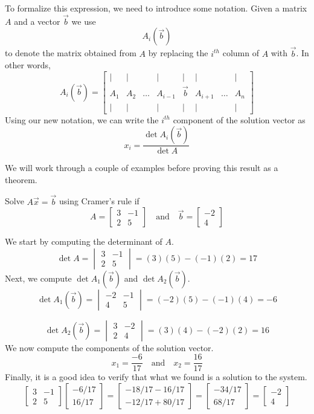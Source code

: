 \documentclass{ximera}
\begin{document}
To formalize this expression, we need to introduce some notation.  Given a matrix $A$ and a vector $\vec{b}$ we use 
$$A_i(\vec{b})$$
to denote the matrix obtained from $A$ by replacing the $i^{th}$ column of $A$ with $\vec{b}$. In other words,
$$A_i(\vec{b})=\begin{bmatrix}
           | & |& &|&|&|&&|\\
		A_1 & A_2&\dots &A_{i-1}&\vec{b}&A_{i+1}&\dots&A_n\\
		| & |& &|&|&|&&|
         \end{bmatrix}$$
Using our new notation, we can write the $i^{th}$ component of the solution vector as
$$x_i=\frac{\det{A_i(\vec{b})}}{\det{A}}$$

We will work through a couple of examples before proving this result as a theorem.

\begin{example}\label{ex:cramer2by2}
Solve $A\vec{x}=\vec{b}$ using Cramer's rule if
$$A=\begin{bmatrix}3&-1\\2&5\end{bmatrix}\quad\text{and}\quad \vec{b}=\begin{bmatrix}-2\\4\end{bmatrix}$$

\begin{explanation}
We start by computing the determinant of $A$.
$$\det{A}=\begin{vmatrix}3&-1\\2&5\end{vmatrix}=(3)(5)-(-1)(2)=17$$
Next, we compute $\det{A_1(\vec{b})}$ and $\det{A_2(\vec{b})}$.
$$\det{A_1(\vec{b})}=\begin{vmatrix}-2&-1\\4&5\end{vmatrix}=(-2)(5)-(-1)(4)=-6$$

$$\det{A_2(\vec{b})}=\begin{vmatrix}3&-2\\2&4\end{vmatrix}=(3)(4)-(-2)(2)=16$$
We now compute the components of the solution vector.
$$x_1=\frac{-6}{17}\quad\text{and}\quad x_2=\frac{16}{17}$$
Finally, it is a good idea to verify that what we found is a solution to the system.
$$\begin{bmatrix}3&-1\\2&5\end{bmatrix}\begin{bmatrix}-6/17\\16/17\end{bmatrix}=\begin{bmatrix}-18/17-16/17\\-12/17+80/17\end{bmatrix}=\begin{bmatrix}-34/17\\68/17\end{bmatrix}=\begin{bmatrix}-2\\4\end{bmatrix}$$
\end{explanation}
\end{example}
\end{document}
